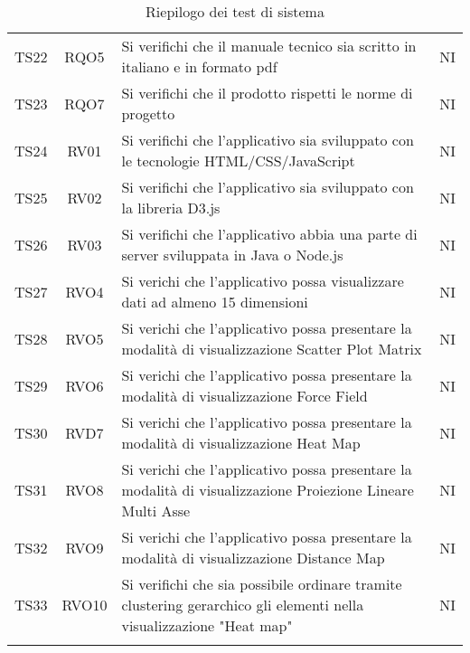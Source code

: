 \documentclass[../piano_di_qualifica.tex]{subfiles}
\begin{document}
\begin{center}
\begin{longtable}{|c|c|p{8cm}|c|}
		TS22              & RQO5                   & Si verifichi che il manuale tecnico sia scritto in italiano e in formato pdf                                           & NI                         \\
		TS23              & RQO7                   & Si verifichi che il prodotto rispetti le norme di progetto                                                             & NI                         \\
		TS24              & RV01                   & Si verifichi che l'applicativo sia sviluppato con le tecnologie HTML/CSS/JavaScript                                    & NI                         \\
		TS25              & RV02                   & Si verifichi che l'applicativo sia sviluppato con la libreria D3.js                                                    & NI                         \\
		TS26              & RV03                   & Si verifichi che l'applicativo abbia una parte di server sviluppata in Java o Node.js                                  & NI                         \\
		TS27              & RVO4                   & Si verichi che l’applicativo possa visualizzare dati ad almeno 15 dimensioni                                           & NI                         \\
		TS28              & RVO5                   & Si verichi che l’applicativo possa presentare la modalità di visualizzazione Scatter Plot Matrix                       & NI                         \\
		TS29              & RVO6                   & Si verichi che l’applicativo possa presentare la modalità di visualizzazione Force Field                               & NI                         \\
		TS30              & RVD7                   & Si verichi che l’applicativo possa presentare la modalità di visualizzazione Heat Map                                  & NI                         \\
		TS31              & RVO8                   & Si verichi che l’applicativo possa presentare la modalità di visualizzazione Proiezione Lineare Multi Asse             & NI                         \\
		TS32              & RVO9                   & Si verichi che l’applicativo possa presentare la modalità di visualizzazione Distance Map                              & NI                         \\
		TS33              & RVO10                  & Si verifichi che sia possibile ordinare tramite clustering gerarchico gli elementi nella visualizzazione "Heat map"    & NI                         \\
		\hline
		\rowcolor{white}
		\caption{Riepilogo dei test di sistema}
	\end{longtable}

\end{center}
\end{document}
